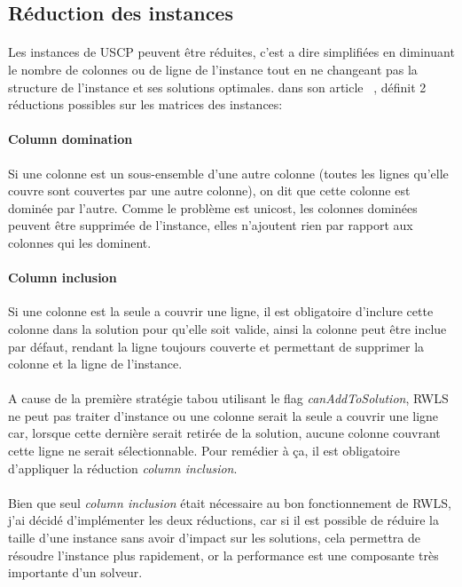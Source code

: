 \documentclass[a4paper,11pt,twoside,french,report]{../common/simplem}
\begin{document}
			\subsection{Réduction des instances}\label{sec:reduction}
				\paragraph*{}
					Les instances de \gls{USCP} peuvent être réduites, c'est a dire simplifiées en diminuant le nombre de colonnes ou de ligne de l'instance tout en ne changeant pas la structure de l'instance et ses solutions optimales. \citeauthor{Beasley1987} dans son article ~\cite{Beasley1987}, définit 2 réductions possibles sur les matrices des instances:
				\paragraph*{Column domination\\}
					Si une colonne est un sous-ensemble d'une autre colonne (toutes les lignes qu'elle couvre sont couvertes par une autre colonne), on dit que cette colonne est dominée par l'autre. Comme le problème est unicost, les colonnes dominées peuvent être supprimée de l'instance, elles n'ajoutent rien par rapport aux colonnes qui les dominent.
				\paragraph*{Column inclusion\\}
					Si une colonne est la seule a couvrir une ligne, il est obligatoire d'inclure cette colonne dans la solution pour qu'elle soit valide, ainsi la colonne peut être inclue par défaut, rendant la ligne toujours couverte et permettant de supprimer la colonne et la ligne de l'instance.
				\paragraph*{}
					A cause de la première stratégie tabou utilisant le flag \textit{canAddToSolution}, \gls{RWLS} ne peut pas traiter d'instance ou une colonne serait la seule a couvrir une ligne car, lorsque cette dernière serait retirée de la solution, aucune colonne couvrant cette ligne ne serait sélectionnable. Pour remédier à ça, il est obligatoire d'appliquer la réduction \textit{column inclusion}.
				\paragraph*{}
					Bien que seul \textit{column inclusion} était nécessaire au bon fonctionnement de \gls{RWLS}, j'ai décidé d'implémenter les deux réductions, car si il est possible de réduire la taille d'une instance sans avoir d'impact sur les solutions, cela permettra de résoudre l'instance plus rapidement, or la performance est une composante très importante d'un solveur.
\end{document}
